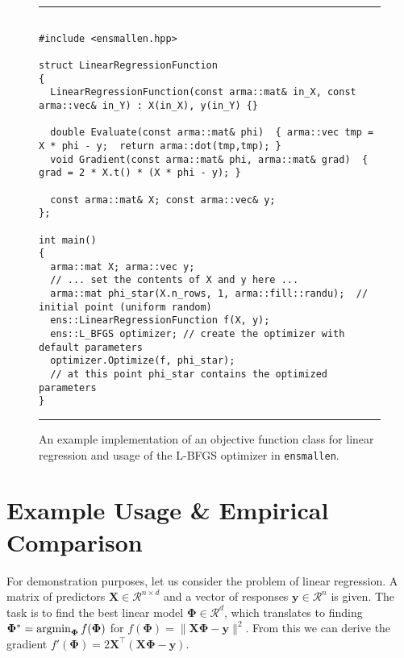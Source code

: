 \documentclass[twoside,11pt]{article}
\begin{document}
\begin{figure}[b!]
\hrule
\vspace{1ex}
\centering
\begin{verbatim}

#include <ensmallen.hpp>

struct LinearRegressionFunction
{
  LinearRegressionFunction(const arma::mat& in_X, const arma::vec& in_Y) : X(in_X), y(in_Y) {}

  double Evaluate(const arma::mat& phi)  { arma::vec tmp = X * phi - y;  return arma::dot(tmp,tmp); }
  void Gradient(const arma::mat& phi, arma::mat& grad)  { grad = 2 * X.t() * (X * phi - y); }

  const arma::mat& X; const arma::vec& y;
};

int main() 
{
  arma::mat X; arma::vec y;
  // ... set the contents of X and y here ...
  arma::mat phi_star(X.n_rows, 1, arma::fill::randu);  // initial point (uniform random)
  ens::LinearRegressionFunction f(X, y);
  ens::L_BFGS optimizer; // create the optimizer with default parameters
  optimizer.Optimize(f, phi_star);
  // at this point phi_star contains the optimized parameters
}
\end{verbatim}
\hrule
\vspace*{-0.5em}
\caption{An example implementation of an objective function class for linear
regression and usage of the L-BFGS optimizer in {\tt ensmallen}.
}
\label{fig:lr_function}
\vspace*{-2em}
\end{figure}


\section{Example Usage \& Empirical Comparison}
\label{sec:linreg_example}

For demonstration purposes, let us consider the problem of linear regression.
A matrix of predictors $\bm X \in \mathcal{R}^{n \times d}$
and a vector of responses $\bm y \in \mathcal{R}^n$ is given.
The task is to find the best linear model $\bm \Phi \in \mathcal{R}^d$,
which translates to finding
$\bm \Phi^* = \operatornamewithlimits{argmin}_{\bm\Phi} f(\bm \Phi)$ for
$f(\bm \Phi) = \| \bm X \bm \Phi - \bm y \|^2.$
From this we can derive the gradient
$f'(\bm \Phi) = 2 \bm X^{\top} (\bm X \bm \Phi - \bm y).$
\end{document}
